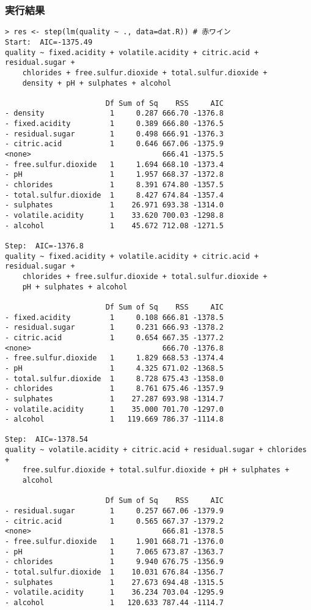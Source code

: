 \documentclass{jsarticle}
\begin{document}
\subsubsection*{実行結果}
\begin{verbatim}
> res <- step(lm(quality ~ ., data=dat.R)) # 赤ワイン
Start:  AIC=-1375.49
quality ~ fixed.acidity + volatile.acidity + citric.acid + residual.sugar + 
    chlorides + free.sulfur.dioxide + total.sulfur.dioxide + 
    density + pH + sulphates + alcohol

                       Df Sum of Sq    RSS     AIC
- density               1     0.287 666.70 -1376.8
- fixed.acidity         1     0.389 666.80 -1376.5
- residual.sugar        1     0.498 666.91 -1376.3
- citric.acid           1     0.646 667.06 -1375.9
<none>                              666.41 -1375.5
- free.sulfur.dioxide   1     1.694 668.10 -1373.4
- pH                    1     1.957 668.37 -1372.8
- chlorides             1     8.391 674.80 -1357.5
- total.sulfur.dioxide  1     8.427 674.84 -1357.4
- sulphates             1    26.971 693.38 -1314.0
- volatile.acidity      1    33.620 700.03 -1298.8
- alcohol               1    45.672 712.08 -1271.5

Step:  AIC=-1376.8
quality ~ fixed.acidity + volatile.acidity + citric.acid + residual.sugar + 
    chlorides + free.sulfur.dioxide + total.sulfur.dioxide + 
    pH + sulphates + alcohol

                       Df Sum of Sq    RSS     AIC
- fixed.acidity         1     0.108 666.81 -1378.5
- residual.sugar        1     0.231 666.93 -1378.2
- citric.acid           1     0.654 667.35 -1377.2
<none>                              666.70 -1376.8
- free.sulfur.dioxide   1     1.829 668.53 -1374.4
- pH                    1     4.325 671.02 -1368.5
- total.sulfur.dioxide  1     8.728 675.43 -1358.0
- chlorides             1     8.761 675.46 -1357.9
- sulphates             1    27.287 693.98 -1314.7
- volatile.acidity      1    35.000 701.70 -1297.0
- alcohol               1   119.669 786.37 -1114.8

Step:  AIC=-1378.54
quality ~ volatile.acidity + citric.acid + residual.sugar + chlorides + 
    free.sulfur.dioxide + total.sulfur.dioxide + pH + sulphates + 
    alcohol

                       Df Sum of Sq    RSS     AIC
- residual.sugar        1     0.257 667.06 -1379.9
- citric.acid           1     0.565 667.37 -1379.2
<none>                              666.81 -1378.5
- free.sulfur.dioxide   1     1.901 668.71 -1376.0
- pH                    1     7.065 673.87 -1363.7
- chlorides             1     9.940 676.75 -1356.9
- total.sulfur.dioxide  1    10.031 676.84 -1356.7
- sulphates             1    27.673 694.48 -1315.5
- volatile.acidity      1    36.234 703.04 -1295.9
- alcohol               1   120.633 787.44 -1114.7


\end{verbatim}
\end{document}
